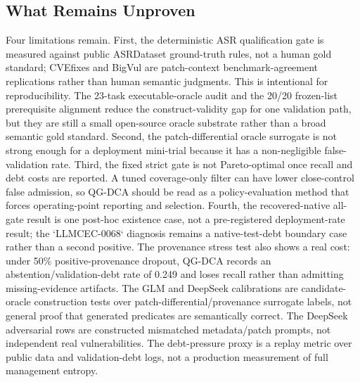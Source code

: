 ﻿\documentclass[lettersize,journal]{IEEEtran}
\begin{document}
\subsection{What Remains Unproven}
Four limitations remain. First, the deterministic ASR qualification gate is measured against public ASRDataset ground-truth rules, not a human gold standard; CVEfixes and BigVul are patch-context benchmark-agreement replications rather than human semantic judgments. This is intentional for reproducibility. The 23-task executable-oracle audit and the 20/20 frozen-list prerequisite alignment reduce the construct-validity gap for one validation path, but they are still a small open-source oracle substrate rather than a broad semantic gold standard. Second, the patch-differential oracle surrogate is not strong enough for a deployment mini-trial because it has a non-negligible false-validation rate. Third, the fixed strict gate is not Pareto-optimal once recall and debt costs are reported. A tuned coverage-only filter can have lower close-control false admission, so QG-DCA should be read as a policy-evaluation method that forces operating-point reporting and selection. Fourth, the recovered-native all-gate result is one post-hoc existence case, not a pre-registered deployment-rate result; the `LLMCEC-0068` diagnosis remains a native-test-debt boundary case rather than a second positive. The provenance stress test also shows a real cost: under 50\% positive-provenance dropout, QG-DCA records an abstention/validation-debt rate of 0.249 and loses recall rather than admitting missing-evidence artifacts. The GLM and DeepSeek calibrations are candidate-oracle construction tests over patch-differential/provenance surrogate labels, not general proof that generated predicates are semantically correct. The DeepSeek adversarial rows are constructed mismatched metadata/patch prompts, not independent real vulnerabilities. The debt-pressure proxy is a replay metric over public data and validation-debt logs, not a production measurement of full management entropy.
\end{document}
